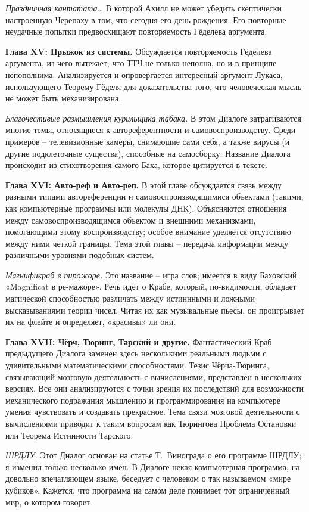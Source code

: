 \documentclass[../main.tex]{subfiles}
\begin{document}
\emph{Праздничная кантатата\ldots{}}
В которой Ахилл не может убедить скептически настроенную Черепаху в том, что сегодня его день рождения. Его повторные неудачные попытки предвосхищают повторяемость Гёделева аргумента.

\textbf{Глава XV: Прыжок из системы.}
Обсуждается повторяемость Гёделева аргумента, из чего вытекает, что ТТЧ не только неполна, но и в принципе непополнима. Анализируется и опровергается интересный аргумент Лукаса, использующего Теорему Гёделя для доказательства того, что человеческая мысль не может быть механизирована.

\emph{Благочестивые размышления курильщика табака.}
В этом Диалоге затрагиваются многие темы, относящиеся к автореферентности и самовоспроизводству. Среди примеров \--- телевизионные камеры, снимающие сами себя, а также вирусы (и другие подклеточные существа), способные на самосборку. Название Диалога происходит из стихотворения самого Баха, которое цитируется в тексте.

\textbf{Глава XVI: Авто-реф и Авто-реп.}
В этой главе обсуждается связь между разными типами автореференции и самовоспроизводящимися объектами (такими, как компьютерные программы или молекулы ДНК). Объясняются отношения между самовоспроизводящимся объектом и внешними механизмами, помогающими этому воспроизводству; особое внимание уделяется отсутствию между ними четкой границы. Тема этой главы \--- передача информации между различными уровнями подобных систем.

\emph{Магнификраб в пирожоре.}
Это название \--- игра слов; имеется в виду Баховский «Magnificat в ре-мажоре». Речь идет о Крабе, который, по-видимости, обладает магической способностью различать между истиннными и ложными высказываниями теории чисел. Читая их как музыкальные пьесы, он проигрывает их на флейте и определяет, «красивы» ли они.

\textbf{Глава XVII: Чёрч, Тюринг, Тарский и другие.}
Фантастический Краб предыдущего Диалога заменен здесь несколькими реальными людьми с удивительными математическими способностями. Тезис Чёрча-Тюринга, связывающий мозговую деятельность с вычислениями, представлен в нескольких версиях. Все они анализируются с точки зрения их последствий для возможности механического подражания мышлению и программирования на компьютере умения чувствовать и создавать прекрасное. Тема связи мозговой деятельности с вычислениями приводит к таким вопросам как Тюрингова Проблема Остановки или Теорема Истинности Тарского.

\emph{ШРДЛУ.}
Этот Диалог основан на статье Т.~Винограда о его программе ШРДЛУ; я изменил только несколько имен. В Диалоге некая компьютерная программа, на довольно впечатляющем языке, беседует с человеком о так называемом «мире кубиков». Кажется, что программа на самом деле понимает тот ограниченный мир, о котором говорит.
\end{document}
